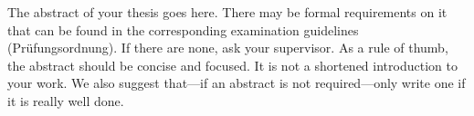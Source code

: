The abstract of your thesis goes here.
There may be formal requirements on it that can be found in the corresponding examination guidelines (Prüfungsordnung).
If there are none, ask your supervisor.
As a rule of thumb, the abstract should be concise and focused. It is not a shortened introduction to your work.
We also suggest that---if an abstract is not required---only write one if it is really well done.
